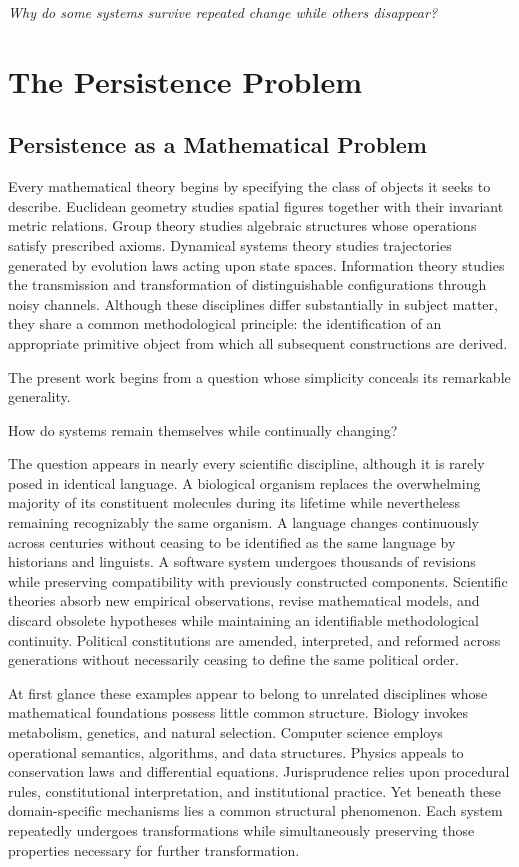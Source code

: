\documentclass[11pt]{book}
\numberwithin{equation}{chapter}
\theoremstyle{definition}
\theoremstyle{plain}
\begin{document}
\begin{center}
\emph{Why do some systems survive repeated change while others disappear?}
\end{center}

\chapter{The Persistence Problem}

\section{Persistence as a Mathematical Problem}

Every mathematical theory begins by specifying the class of objects it seeks to describe. Euclidean geometry studies spatial figures together with their invariant metric relations. Group theory studies algebraic structures whose operations satisfy prescribed axioms. Dynamical systems theory studies trajectories generated by evolution laws acting upon state spaces. Information theory studies the transmission and transformation of distinguishable configurations through noisy channels. Although these disciplines differ substantially in subject matter, they share a common methodological principle: the identification of an appropriate primitive object from which all subsequent constructions are derived.

The present work begins from a question whose simplicity conceals its remarkable generality.

How do systems remain themselves while continually changing?

The question appears in nearly every scientific discipline, although it is rarely posed in identical language. A biological organism replaces the overwhelming majority of its constituent molecules during its lifetime while nevertheless remaining recognizably the same organism. A language changes continuously across centuries without ceasing to be identified as the same language by historians and linguists. A software system undergoes thousands of revisions while preserving compatibility with previously constructed components. Scientific theories absorb new empirical observations, revise mathematical models, and discard obsolete hypotheses while maintaining an identifiable methodological continuity. Political constitutions are amended, interpreted, and reformed across generations without necessarily ceasing to define the same political order.

At first glance these examples appear to belong to unrelated disciplines whose mathematical foundations possess little common structure. Biology invokes metabolism, genetics, and natural selection. Computer science employs operational semantics, algorithms, and data structures. Physics appeals to conservation laws and differential equations. Jurisprudence relies upon procedural rules, constitutional interpretation, and institutional practice. Yet beneath these domain-specific mechanisms lies a common structural phenomenon. Each system repeatedly undergoes transformations while simultaneously preserving those properties necessary for further transformation.
\end{document}
